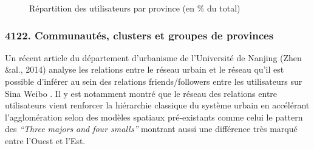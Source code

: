 \begin{figure}
    \centering

     

    \caption{
        R\'epartition des utilisateurs par province (en \% du total)
    }

\end{figure}


\subsubsection{4122. Communaut\'es, clusters et groupes de provinces}
Un r\'ecent article du d\'epartement d{\textquoteright}urbanisme de
l{\textquoteright}Universit\'e de Nanjing (Zhen \&al., 2014) analyse
les relations entre le r\'eseau urbain et le r\'eseau
qu{\textquoteright}il est possible d{\textquoteright}inf\'erer au sein
des relations friends/followers entre les utilisateurs sur Sina Weibo .
Il y est notamment montr\'e que le r\'eseau des relations entre
utilisateurs vient renforcer la hi\'erarchie classique du syst\`eme
urbain en acc\'el\'erant l{\textquoteright}agglom\'eration selon des
mod\`eles spatiaux pr\'e-existants comme celui le pattern des
\textit{{\textquotedblleft}Three majors }\textit{and four
smalls{\textquotedblright} }montrant aussi une diff\'erence tr\`es
marqu\'e entre l{\textquoteright}Ouest et l{\textquoteright}Est.


